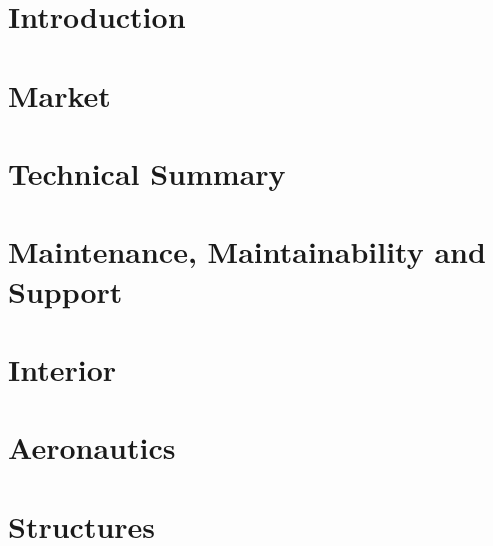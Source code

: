 \documentclass[12pt]{article} %
\numberwithin{figure}{section}
\numberwithin{table}{section}
\begin{document}

\listoftables

\newpage %

\renewcommand*{\thepage}{\arabic{section}-\arabic{page}}

\newpage
\setcounter{page}{1}
\section{Introduction}
    

\newpage
\setcounter{page}{1}
\section{Market}
    

\newpage
\setcounter{page}{1}
\section{Technical Summary}
    

\newpage
\setcounter{page}{1}
\section{Maintenance, Maintainability and Support}
    

\newpage
\setcounter{page}{1}
\section{Interior}
    

\newpage
\setcounter{page}{1}
\section{Aeronautics}
    

\newpage
\setcounter{page}{1}
\section{Structures}
    
\end{document}

